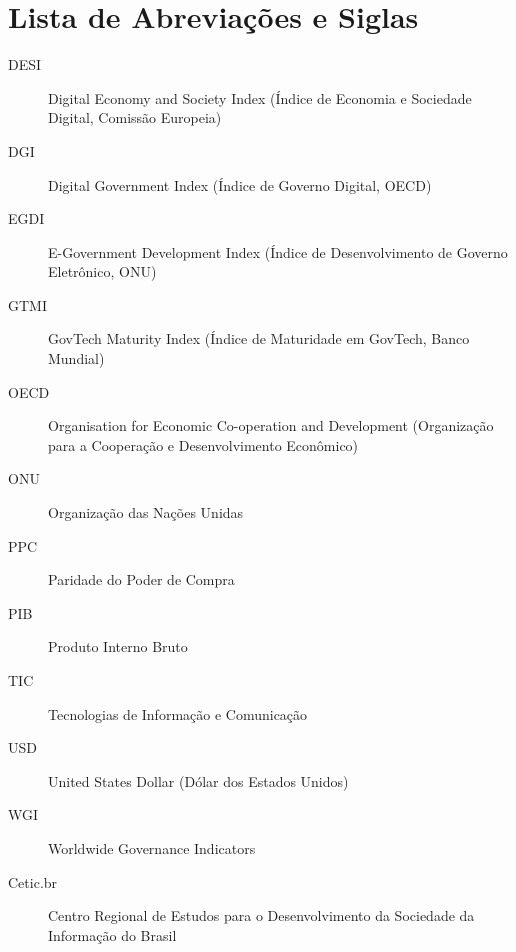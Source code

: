 \chapter*{Lista de Abreviações e Siglas}

\begin{description}
    \item[DESI] Digital Economy and Society Index (Índice de Economia e Sociedade Digital, Comissão Europeia)
    \item[DGI] Digital Government Index (Índice de Governo Digital, OECD)
    \item[EGDI] E-Government Development Index (Índice de Desenvolvimento de Governo Eletrônico, ONU)
    \item[GTMI] GovTech Maturity Index (Índice de Maturidade em GovTech, Banco Mundial)
    \item[OECD] Organisation for Economic Co-operation and Development (Organização para a Cooperação e Desenvolvimento Econômico)
    \item[ONU] Organização das Nações Unidas
    \item[PPC] Paridade do Poder de Compra
    \item[PIB] Produto Interno Bruto
    \item[TIC] Tecnologias de Informação e Comunicação
    \item[USD] United States Dollar (Dólar dos Estados Unidos)
    \item[WGI] Worldwide Governance Indicators
    \item[Cetic.br] Centro Regional de Estudos para o Desenvolvimento da Sociedade da Informação do Brasil
\end{description}